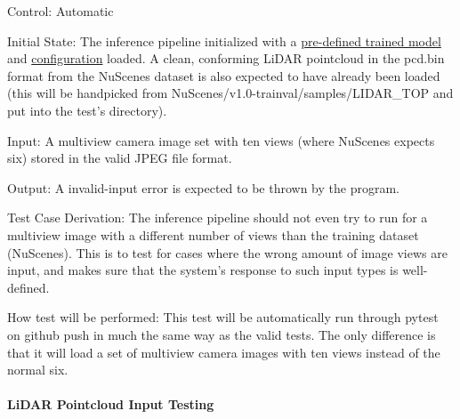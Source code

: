 \documentclass[12pt, titlepage]{article}
\begin{document}
\begin{enumerate}
Control: Automatic
					
Initial State: The inference pipeline initialized with a \href{https://drive.google.com/file/d/1X50b-8immqlqD8VPAUkSKI0Ls-4k37g9/view}{pre-defined trained model} and \href{https://github.com/open-mmlab/OpenPCDet/blob/master/tools/cfgs/nuscenes_models/bevfusion.yaml}{configuration} loaded. A clean, conforming LiDAR pointcloud in the pcd.bin format
from the NuScenes dataset is also expected to have already been loaded (this will be handpicked from NuScenes/v1.0-trainval/samples/LIDAR\_TOP and put into the test's directory).
					
Input: A multiview camera image set with ten views (where NuScenes expects six) stored in the valid JPEG file format.
					
Output: A invalid-input error is expected to be thrown by the program.

Test Case Derivation: The inference pipeline should not even try to run for a multiview image with a different number of views than the training dataset (NuScenes). This is to test for cases
where the wrong amount of image views are input, and makes sure that the system's response to such input types is well-defined. 

How test will be performed: This test will be automatically run through pytest on github push in much the same way as the valid tests. The only difference is that it will
load a set of multiview camera images with ten views instead of the normal six.

\end{enumerate}

\paragraph{LiDAR Pointcloud Input Testing}
\end{document}
